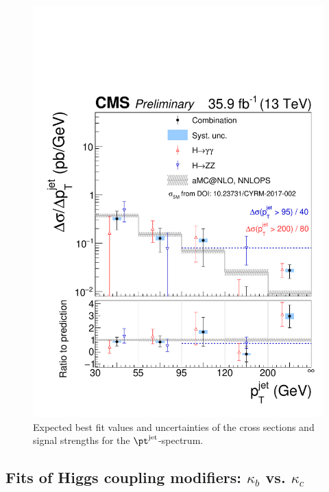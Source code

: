 \begin{figure}[hbtp]
  \begin{center}
    \includegraphics[width=\cmsFigWidth]{img/resultsapproval/reworked/spectra_ptjet.pdf}
    \caption{
        Expected best fit values and uncertainties of the cross sections and signal strengths for the $\ptjet$-spectrum.
        }
    \label{fig:CombinedSpectra_ptjet}
  \end{center}
\end{figure}


\toggledclearpage
\subsection{Fits of Higgs coupling modifiers: \texorpdfstring{$\kappa_b$}{kb} vs. \texorpdfstring{$\kappa_c$}{kc}}
\label{sec:ResultsKappabKappac}

